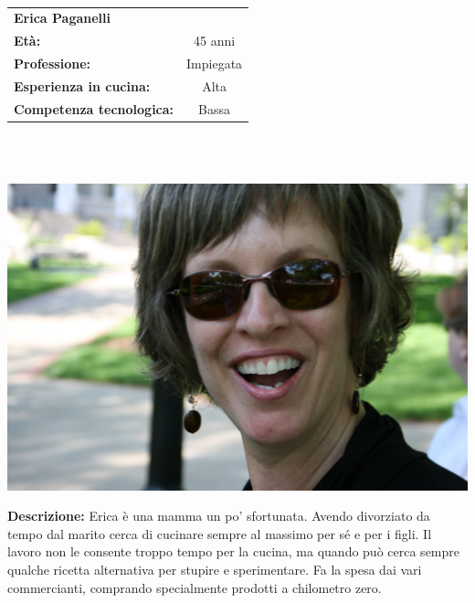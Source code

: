 \hrulefill\\
\begin{minipage}{.75\textwidth}
\begin{tabular}{l | c}
	\textbf{Erica Paganelli} & \\
	\textbf{Età:} & 45 anni\\
	\textbf{Professione:} & Impiegata\\
	\textbf{Esperienza in cucina:} & Alta\\
	\textbf{Competenza tecnologica:} & Bassa\\
\end{tabular}\\\\
\end{minipage}
\begin{minipage}{.24\textwidth}
	\includegraphics[width=\textwidth]{img/personas/erica_2}
\end{minipage}
	\textbf{Descrizione:}
	Erica è una mamma un po' sfortunata. Avendo divorziato da tempo dal marito
	cerca di cucinare sempre al massimo per sé e per i figli.
	Il lavoro non le consente troppo tempo per la cucina, ma quando può
	cerca sempre qualche ricetta alternativa per stupire e sperimentare. Fa
	la spesa dai vari commercianti, comprando specialmente prodotti a
	chilometro zero.

